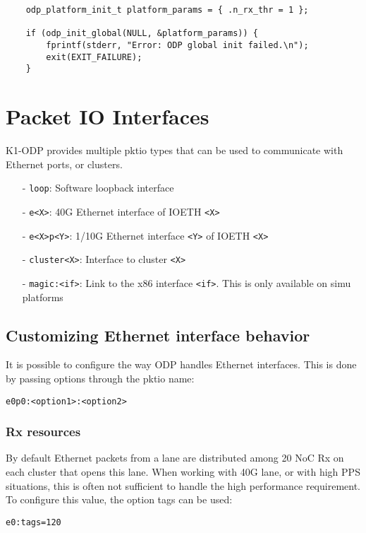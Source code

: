 \documentclass{trkalray}
\begin{document}
\begin{lstlisting}
	odp_platform_init_t platform_params = { .n_rx_thr = 1 };

	if (odp_init_global(NULL, &platform_params)) {
		fprintf(stderr, "Error: ODP global init failed.\n");
		exit(EXIT_FAILURE);
	}
\end{lstlisting}

\section{Packet IO Interfaces}

K1-ODP provides multiple pktio types that can be used to communicate
with Ethernet ports, or clusters.

\begin{itemize}
\item[-]{\texttt{loop}: Software loopback interface}
\item[-]{\texttt{e<X>}: 40G Ethernet interface of IOETH \texttt{<X>}}
\item[-]{\texttt{e<X>p<Y>}: 1/10G Ethernet interface \texttt{<Y>} of
  IOETH \texttt{<X>}}
\item[-]{\texttt{cluster<X>}: Interface to cluster \texttt{<X>}}
\item[-]{\texttt{magic:<if>}: Link to the x86 interface
  \texttt{<if>}. This is only available on simu platforms}
\end{itemize}

\subsection{Customizing Ethernet interface behavior}

It is possible to configure the way ODP handles Ethernet interfaces.
This is done by passing options through the pktio name:
\begin{lstlisting}
e0p0:<option1>:<option2>
\end{lstlisting}

\subsubsection{Rx resources}

By default Ethernet packets from a lane are distributed among 20 NoC Rx on each
cluster that opens this lane.
When working with 40G lane, or with high PPS situations, this is often
not sufficient to handle the high performance requirement.
To configure this value, the option tags can be used:
\begin{lstlisting}
e0:tags=120
\end{lstlisting}
\end{document}
